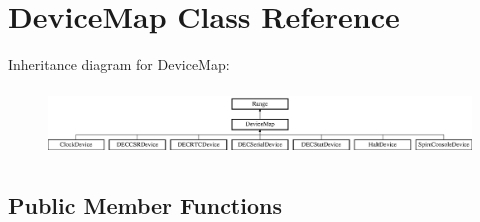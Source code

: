 \hypertarget{classDeviceMap}{
\section{DeviceMap Class Reference}
\label{classDeviceMap}
}
Inheritance diagram for DeviceMap:\begin{figure}[H]
\begin{center}
\leavevmode
\includegraphics[height=1.80451cm]{classDeviceMap}
\end{center}
\end{figure}
\subsection*{Public Member Functions}
